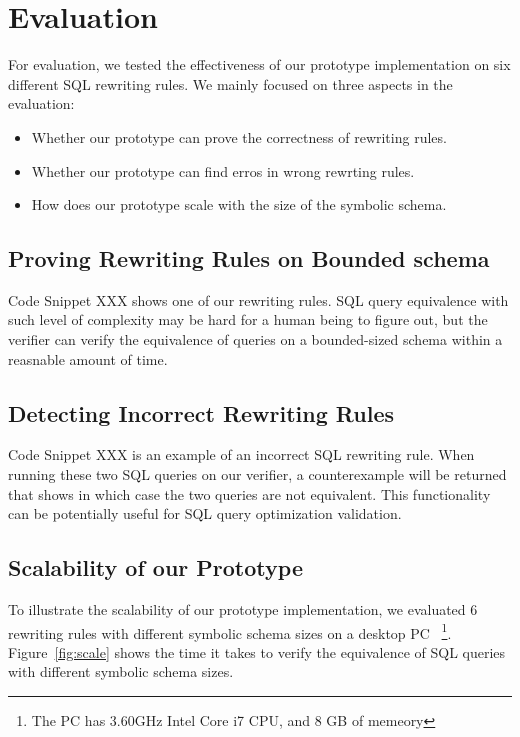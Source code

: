 \section{Evaluation}
For evaluation, we tested the effectiveness of our prototype implementation 
on six different SQL rewriting rules.
We mainly focused on three aspects in the evaluation:
\begin{itemize}
\item Whether our prototype can prove the correctness of rewriting rules.
\item Whether our prototype can find erros in wrong rewrting rules.
\item How does our prototype scale with the size of the symbolic schema.
\end{itemize}

\subsection{Proving Rewriting Rules on Bounded schema}
Code Snippet XXX shows one of our rewriting rules. 
SQL query equivalence with such level of complexity may be hard for a human being to 
figure out, but the verifier can verify the equivalence of queries on a bounded-sized 
schema within a reasnable amount of time.

\subsection{Detecting Incorrect Rewriting Rules}
Code Snippet XXX is an example of an incorrect SQL rewriting rule.
When running these two SQL queries on our verifier, a counterexample will be returned that
shows in which case the two queries are not equivalent.
This functionality can be potentially useful for SQL query optimization validation.

\subsection{Scalability of our Prototype}
To illustrate the scalability of our prototype implementation, we evaluated
6 rewriting rules with different symbolic schema sizes on a desktop PC
~\footnote{The PC has 3.60GHz Intel Core i7 CPU, and 8 GB of memeory}.
Figure~\ref{fig:scale} shows the time it takes to verify the equivalence of SQL queries
with different symbolic schema sizes.

